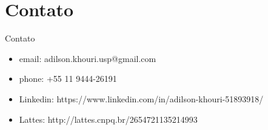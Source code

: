 \section{Contato}

\begin{frame}	
	\begin{block}{Contato}	
		\begin{itemize}
			\item email: adilson.khouri.usp@gmail.com
			\item phone: +55 11 9444-26191
			\item Linkedin: https://www.linkedin.com/in/adilson-khouri-51893918/
			\item Lattes: http://lattes.cnpq.br/2654721135214993
		\end{itemize}
	\end{block}
\end{frame}
